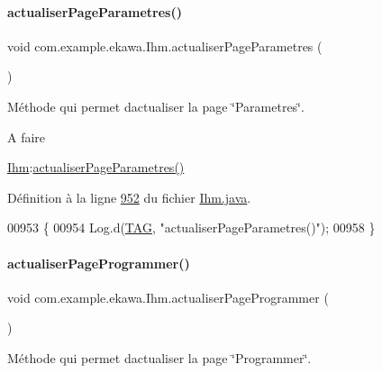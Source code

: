 \paragraph{\texorpdfstring{actualiser\+Page\+Parametres()}{actualiserPageParametres()}}
{\footnotesize\ttfamily void com.\+example.\+ekawa.\+Ihm.\+actualiser\+Page\+Parametres (\begin{DoxyParamCaption}{ }\end{DoxyParamCaption})}



Méthode qui permet d\textquotesingle{}actualiser la page \char`\"{}\+Parametres\char`\"{}. 

\begin{DoxyRefDesc}{A faire}
\item[\hyperlink{todo__todo000003}{A faire}]\hyperlink{classcom_1_1example_1_1ekawa_1_1_ihm}{Ihm}\+:\hyperlink{classcom_1_1example_1_1ekawa_1_1_ihm_a7eca80c1cbf9a0f0f5c82dd79d32f4f4}{actualiser\+Page\+Parametres()} \end{DoxyRefDesc}


Définition à la ligne \hyperlink{_ihm_8java_source_l00952}{952} du fichier \hyperlink{_ihm_8java_source}{Ihm.\+java}.


\begin{DoxyCode}
00953     \{
00954         Log.d(\hyperlink{classcom_1_1example_1_1ekawa_1_1_ihm_a95cd92c2acaf9f8982302da08d94f9aa}{TAG}, \textcolor{stringliteral}{"actualiserPageParametres()"});
00958     \}
\end{DoxyCode}
\mbox{\label{classcom_1_1example_1_1ekawa_1_1_ihm_adbeeac61b5a53c52d21da490659de983}} 
\paragraph{\texorpdfstring{actualiser\+Page\+Programmer()}{actualiserPageProgrammer()}}
{\footnotesize\ttfamily void com.\+example.\+ekawa.\+Ihm.\+actualiser\+Page\+Programmer (\begin{DoxyParamCaption}{ }\end{DoxyParamCaption})}



Méthode qui permet d\textquotesingle{}actualiser la page \char`\"{}\+Programmer\char`\"{}. 



